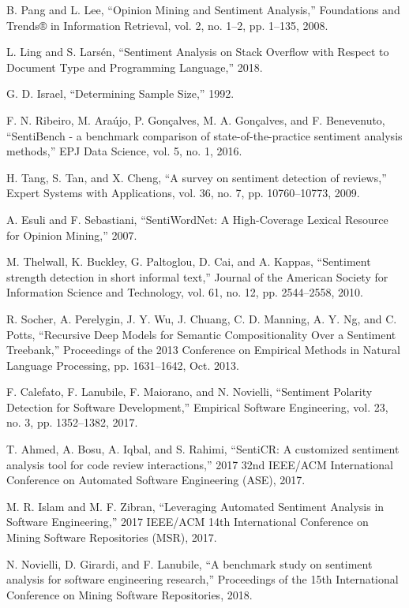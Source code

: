 \documentclass[conference]{IEEEtran}
\begin{document}
\begin{thebibliography}{00}
 B. Pang and L. Lee, “Opinion Mining and Sentiment Analysis,” Foundations and Trends® in Information Retrieval, vol. 2, no. 1–2, pp. 1–135, 2008. 

 L. Ling and S. Larsén, “Sentiment Analysis on Stack Overflow with Respect to Document Type and Programming Language,” 2018. 

 G. D. Israel, “Determining Sample Size,” 1992. 

 F. N. Ribeiro, M. Araújo, P. Gonçalves, M. A. Gonçalves, and F. Benevenuto, “SentiBench - a benchmark comparison of state-of-the-practice sentiment analysis methods,” EPJ Data Science, vol. 5, no. 1, 2016. 

 H. Tang, S. Tan, and X. Cheng, “A survey on sentiment detection of reviews,” Expert Systems with Applications, vol. 36, no. 7, pp. 10760–10773, 2009. 

 A. Esuli and F. Sebastiani, “SentiWordNet: A High-Coverage Lexical Resource for Opinion Mining,” 2007. 

 M. Thelwall, K. Buckley, G. Paltoglou, D. Cai, and A. Kappas, “Sentiment strength detection in short informal text,” Journal of the American Society for Information Science and Technology, vol. 61, no. 12, pp. 2544–2558, 2010. 

 R. Socher, A. Perelygin, J. Y. Wu, J. Chuang, C. D. Manning, A. Y. Ng, and C. Potts, “Recursive Deep Models for Semantic Compositionality Over a Sentiment Treebank,” Proceedings of the 2013 Conference on Empirical Methods in Natural Language Processing, pp. 1631–1642, Oct. 2013. 

 F. Calefato, F. Lanubile, F. Maiorano, and N. Novielli, “Sentiment Polarity Detection for Software Development,” Empirical Software Engineering, vol. 23, no. 3, pp. 1352–1382, 2017. 

 T. Ahmed, A. Bosu, A. Iqbal, and S. Rahimi, “SentiCR: A customized sentiment analysis tool for code review interactions,” 2017 32nd IEEE/ACM International Conference on Automated Software Engineering (ASE), 2017. 

 M. R. Islam and M. F. Zibran, “Leveraging Automated Sentiment Analysis in Software Engineering,” 2017 IEEE/ACM 14th International Conference on Mining Software Repositories (MSR), 2017.

 N. Novielli, D. Girardi, and F. Lanubile, “A benchmark study on sentiment analysis for software engineering research,” Proceedings of the 15th International Conference on Mining Software Repositories, 2018. 


\end{thebibliography}
\end{document}
